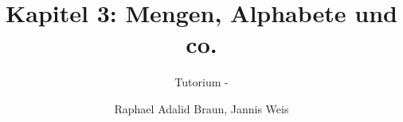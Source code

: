 \documentclass[18pt]{beamer}
\title[Mengen, Alphabete...]{Kapitel 3: Mengen, Alphabete und co.}
\subtitle{Tutorium - } %
\author{Raphael Adalid Braun, Jannis Weis}
\institute{Grundbegriffe der Informatik | WS 2018/19}
\begin{document}

\begin{frame}
	\titlepage
\end{frame}

\title[Mengen]{}

\title[Alphabete]{}

\title[Relationen]{}

\title[Abbildungen]{}

\title[Mehr Mengen & Relationen]{}

\end{document}
